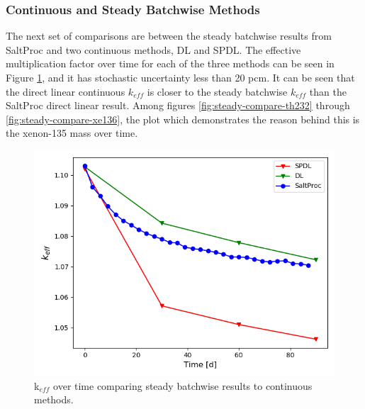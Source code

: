 \subsubsection{Continuous and Steady Batchwise Methods}

The next set of comparisons are between the steady batchwise results from SaltProc and two continuous methods, DL and SPDL. The effective multiplication factor over time for each of the three methods can be seen in Figure \ref{fig:steady-compare-keff}, and it has stochastic uncertainty less than 20 pcm.
It can be seen that the direct linear continuous $k_{eff}$ is closer to the steady batchwise $k_{eff}$ than the SaltProc direct linear result. Among figures \ref{fig:steady-compare-th232} through \ref{fig:steady-compare-xe136}, the plot which demonstrates the reason behind this is the xenon-135 mass over time.

\begin{figure}[H]
  \centering
  \includegraphics[scale=0.7]{images/soln-1-2-keff.png}
  \caption{k$_{eff}$ over time comparing steady batchwise results to continuous methods.}
   \label{fig:steady-compare-keff}
\end{figure}

